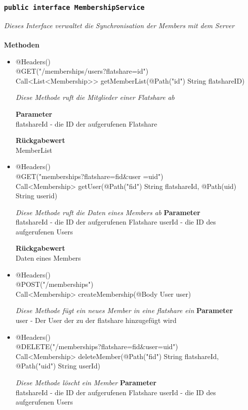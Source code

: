 	\subsubsection{\texttt{public interface  MembershipService }}
\textit{Dieses Interface verwaltet die Synchronisation der Members mit dem Server}\\
\\
	\textbf{Methoden} \\
		\begin{itemize}
		\item{@Headers()\\ @GET("/memberships/users?flatshare={id}") \\ Call<List<Membership>> getMemberList(@Path("id") String flatshareID)}

		\textit{Diese Methode ruft die Mitglieder einer Flatshare ab}

		\textbf{Parameter} \\
	flatshareId - die ID der aufgerufenen Flatshare  

		\textbf{Rückgabewert} \\
	MemberList

      \item{@Headers()\\ @GET("memberships?flatshare={fid}\&user ={uid}")\\Call<Membership> getUser(@Path("fid") String flatshareId, @Path(\grqq uid\grqq) String userid)}

		\textit{Diese Methode ruft die Daten eines Members ab}        	
		\textbf{Parameter} \\
		flatshareId - die ID der aufgerufenen Flatshare 
	userId - die ID des aufgerufenen Users

		\textbf{Rückgabewert} \\
      Daten eines Members


      \item{@Headers()\\ @POST("/memberships")\\ Call<Membership> createMembership(@Body User user)}

		\textit{Diese Methode fügt ein neues Member in eine flatshare ein}        	
		\textbf{Parameter} \\
		user - Der User der zu der flatshare hinzugefügt wird 

	      \item{@Headers()\\ @DELETE("/memberships?flatshare={fid}\&user={uid}")\\Call<Membership> deleteMember(@Path("fid") String flatshareId, @Path("uid") String userId)}

		\textit{Diese Methode löscht ein Member}        	
		\textbf{Parameter} \\
		flatshareId - die ID der aufgerufenen Flatshare 
	userId - die ID des aufgerufenen Users


	 \end{itemize}

